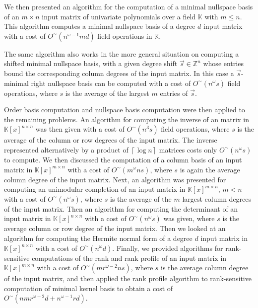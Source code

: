 We then presented an algorithm for the computation of a minimal nullspace
basis of an $m\times n$ input matrix of univariate polynomials over
a field $\mathbb{K}$ with $m\le n$. This algorithm computes a minimal
nullspace basis of a degree $d$ input matrix with a cost of $O^{\sim}\left(n^{\omega-1}md\right)$
field operations in $\mathbb{K}$. %
\begin{comment}
Here the soft-$O$ notation is Big-$O$ with log factors removed while
$\omega$ is the exponent of matrix multiplication.
\end{comment}
{} The same algorithm also works in the more general situation on computing
a shifted minimal nullspace basis, with a given degree shift $\vec{s}\in\mathbb{Z}^{n}$
whose entries bound the corresponding column degrees of the input
matrix. In this case a $\vec{s}$-minimal right nullspace basis can
be computed with a cost of $O^{\sim}(n^{\omega}s)$ field operations,
where $s$ is the average of the largest $m$ entries of $\vec{s}$. 

Order basis computation and nullspace basis computation were then
applied to the remaining problems. An algorithm for computing the
inverse of an matrix in $\mathbb{K}\left[x\right]^{n\times n}$ was
then given with a cost of $O^{\sim}\left(n^{3}s\right)$ field operations,
where $s$ is the average of the column or row degrees of the input
matrix. The inverse represented alternatively by a product of $\left\lceil \log n\right\rceil $
matrices costs only $O^{\sim}\left(n^{\omega}s\right)$ to compute.
We then discussed the computation of a column basis of an input matrix
in $\mathbb{K}\left[x\right]^{m\times n}$ with a cost of $O^{\sim}\left(m^{\omega}ns\right)$,
where $s$ is again the average column degree of the input matrix.
Next, an algorithm was presented for computing an unimodular completion
of an input matrix in $\mathbb{K}\left[x\right]^{m\times n}$, $m<n$
with a cost of $O^{\sim}\left(n^{\omega}s\right)$, where $s$ is
the average of the $m$ largest column degrees of the input matrix.
Then an algorithm for computing the determinant of an input matrix
in $\mathbb{K}\left[x\right]^{n\times n}$ with a cost of $O^{\sim}\left(n^{\omega}s\right)$
was given, where $s$ is the average column or row degree of the input
matrix. Then we looked at an algorithm for computing the Hermite normal
form of a degree $d$ input matrix in $\mathbb{K}\left[x\right]^{n\times n}$
with a cost of $O^{\sim}\left(n^{\omega}d\right)$. Finally, we provided
algorithms for rank-sensitive computations of the rank and rank profile
of an input matrix in $\mathbb{K}\left[x\right]^{m\times n}$ with
a cost of $O^{\sim}\left(mr^{\omega-2}ns\right)$, where $s$ is the
average column degree of the input matrix, and then applied the rank
profile algorithm to rank-sensitive computation of minimal kernel
basis to obtain a cost of $O^{\sim}(nmr^{\omega-2}d+n^{\omega-1}rd)$.

